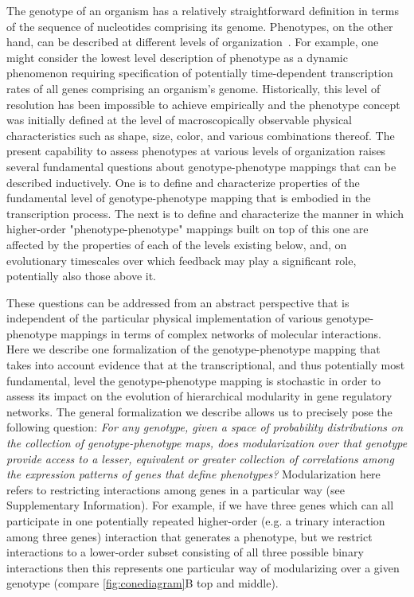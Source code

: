The genotype of an organism has a relatively straightforward definition in terms of the sequence of nucleotides comprising its genome. Phenotypes, on the other hand, can be described at different levels of organization~\cite{Dawkins1982,Stadler2001}. For example, one might consider the lowest level description of phenotype as a dynamic phenomenon requiring specification of potentially time-dependent transcription rates of all genes comprising an organism's genome. Historically, this level of resolution has been impossible to achieve empirically and the phenotype concept was initially defined at the level of macroscopically observable physical characteristics such as shape, size, color, and various combinations thereof. The present capability to assess phenotypes at various levels of organization raises several fundamental questions about genotype-phenotype mappings that can be described inductively. One is to define and characterize properties of the fundamental level of genotype-phenotype mapping that is embodied in the transcription process. The next is to define and characterize the manner in which higher-order "phenotype-phenotype" mappings built on top of this one are affected by the properties of each of the levels existing below, and, on evolutionary timescales over which feedback may play a significant role, potentially also those above it.

These questions can be addressed from an abstract perspective that is independent of the particular physical implementation of various genotype-phenotype mappings in terms of complex networks of molecular interactions. Here we describe one formalization of the genotype-phenotype mapping that takes into account evidence that at the transcriptional, and thus potentially most fundamental, level the genotype-phenotype mapping is stochastic \cite{Swain2002,Paulsson2004,Thattai2004,Acar2008a,Lestas2010,So2011,Munsky2012,Neuert2013,Sanchez2013} in order to assess its impact on the evolution of hierarchical modularity in gene regulatory networks. The general formalization we describe allows us to precisely pose the following question: \emph{For any genotype, given a space of probability distributions on the collection of genotype-phenotype maps, does modularization over that genotype provide access to a lesser, equivalent or greater collection of correlations among the expression patterns of genes that define phenotypes?} Modularization here refers to restricting interactions among genes in a particular way (see Supplementary Information). For example, if we have three genes which can all participate in one potentially repeated higher-order (e.g. a trinary interaction among three genes) interaction that generates a phenotype, but we restrict interactions to a lower-order subset consisting of all three possible binary interactions then this represents one particular way of modularizing over a given genotype (compare \ref{fig:conediagram}B top and middle).


